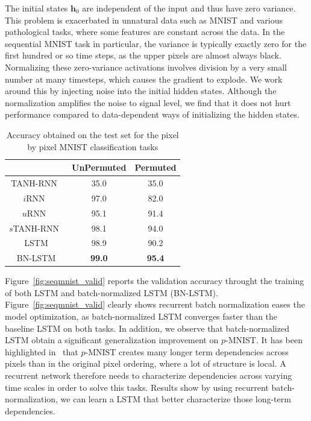 \documentclass{article} %
\newcommand{\vect}[1]{\mathbf{#1}}
\begin{document}
The initial states $\vect{h}_0$ are independent of the input and thus have zero variance.
This problem is exacerbated in unnatural data such as MNIST and various pathological tasks, where some features are constant across the data.
In the sequential MNIST task in particular, the variance is typically exactly zero for the first hundred or so time steps, as the upper pixels are almost always black.
Normalizing these zero-variance activations involves division by a very small number at many timesteps, which causes the gradient to explode.
We work around this by injecting noise into the initial hidden states.
Although the normalization amplifies the noise to signal level, we find that it does not hurt performance compared to data-dependent ways of initializing the hidden states.


\begin{table}
\center
\small
\begin{tabular}{c|c|c}
  & UnPermuted & Permuted\\
  \hline
  TANH-RNN~\cite{le2015simple} & 35.0 & 35.0\\
  $i$RNN~\cite{le2015simple} & 97.0 & 82.0\\
  $u$RNN~\cite{urnn} & 95.1 & 91.4\\
  $s$TANH-RNN~\cite{zhang2016architectural} & 98.1 & 94.0\\
  \hline
  LSTM & 98.9 & 90.2\\
  BN-LSTM & \textbf{99.0} & \textbf{95.4}\\
\end{tabular}
\caption{Accuracy obtained on the test set for the pixel by pixel MNIST classification tasks}
\label{tab:seqmnist_test}

\end{table}



Figure~\ref{fig:seqmnist_valid} reports the validation accuracy throught the training of both LSTM and batch-normalized LSTM (BN-LSTM). Figure~\ref{fig:seqmnist_valid} clearly shows recurrent batch normalization eases the model optimization, as batch-normalized LSTM converges faster than the baseline LSTM on both tasks.
In addition, we observe that batch-normalized LSTM obtain a significant generalization improvement on $p$-MNIST. It has been highlighted in~\cite{urnn}
that $p$-MNIST creates many longer term dependencies across pixels than in
the original pixel ordering, where a lot of structure is local. A recurrent network therefore needs to characterize dependencies across varying time scales in order to solve this tasks. Results show by using recurrent batch-normalization, we can learn a LSTM that better characterize those long-term dependencies.
\end{document}
